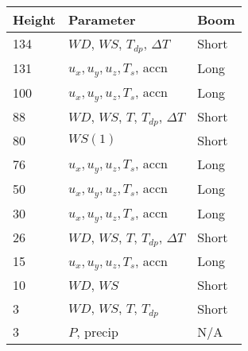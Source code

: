 \centering
\begin{tabular}{lll}
\toprule
Height & Parameter & Boom\\
\midrule
134 & $WD$, $WS$, $T_{dp}$, $\Delta T$ & Short\\
131 & $u_x,u_y,u_z,T_s$, accn & Long\\
100 & $u_x,u_y,u_z,T_s$, accn & Long\\
88 & $WD$, $WS$, $T$, $T_{dp}$, $\Delta T$ & Short\\
80 & $WS(1)$ & Short\\
76 & $u_x,u_y,u_z,T_s$, accn & Long\\
50 & $u_x,u_y,u_z,T_s$, accn & Long\\
30 & $u_x,u_y,u_z,T_s$, accn & Long\\
26 & $WD$, $WS$, $T$, $T_{dp}$, $\Delta T$ & Short\\
15 & $u_x,u_y,u_z,T_s$, accn & Long\\
10 & $WD$, $WS$ & Short\\
3 & $WD$, $WS$, $T$, $T_{dp}$ & Short\\
3 & $P$, precip & N/A\\%
\bottomrule
\end{tabular}